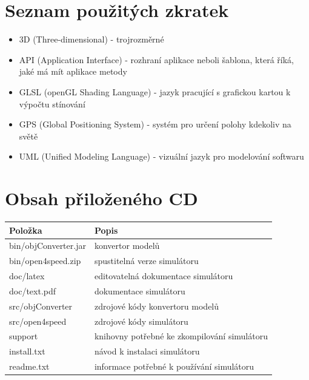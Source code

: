 \documentclass[11pt,twoside,a4paper]{book}
\begin{document}
%

\appendix

\chapter{Seznam použitých zkratek}
\begin{itemize}
\item 3D (Three-dimensional) - trojrozměrné
\item API (Application Interface) - rozhraní aplikace neboli šablona, která říká, jaké má mít aplikace metody
\item GLSL (openGL Shading Language) - jazyk pracující s grafickou kartou k výpočtu stínování
\item GPS (Global Positioning System) - systém pro určení polohy kdekoliv na světě
\item UML (Unified Modeling Language) - vizuální jazyk pro modelování softwaru
\end{itemize}

\chapter{Obsah přiloženého CD}

\begin{center}
\begin{tabular}{|p{50mm}|p{100mm}|}
\hline
\textbf{Položka} & 
\textbf{Popis} \\
\hline
\hline
bin/objConverter.jar & konvertor modelů\\
\hline
bin/open4speed.zip & spustitelná verze simulátoru\\
\hline
doc/latex & editovatelná dokumentace simulátoru\\
\hline
doc/text.pdf & dokumentace simulátoru\\
\hline
src/objConverter & zdrojové kódy konvertoru modelů\\
\hline
src/open4speed & zdrojové kódy simulátoru\\
\hline
support & knihovny potřebné ke zkompilování simulátoru\\
\hline
install.txt & návod k instalaci simulátoru\\
\hline
readme.txt & informace potřebné k používání simulátoru\\
\hline
\end{tabular}
\end{center}
\end{document}
